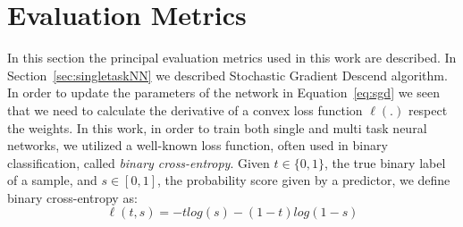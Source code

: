 \section{Evaluation Metrics} \label{sec:methods_metrics}
In this section the principal evaluation metrics used in this work are described. 
In Section~\ref{sec:singletaskNN} we described Stochastic Gradient Descend algorithm. In order to update the parameters of the network in Equation~\ref{eq:sgd} we seen that we need to calculate the derivative of a convex loss function $\ell(.)$ respect the weights. In this work, in order to train both single and multi task neural networks, we utilized a well-known loss function, often used in binary classification, called \emph{binary cross-entropy}. Given $t \in \{0, 1\}$, the true binary label of a sample, and $s \in [0, 1]$, the probability score given by a predictor, we define binary cross-entropy as:
\begin{equation}
    \ell(t, s) = -tlog(s) - (1 - t)log(1 - s)
\end{equation}


